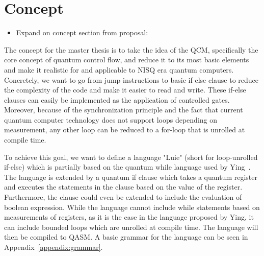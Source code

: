 \chapter{Concept}

\begin{itemize}
    \item Expand on concept section from proposal:
\end{itemize}

The concept for the master thesis is to take the idea of the QCM, specifically the core concept of quantum control flow, and reduce it to its most basic elements and make it realistic for and applicable to NISQ era quantum computers. Concretely, we want to go from jump instructions to basic if-else clause to reduce the complexity of the code and make it easier to read and write. These if-else clauses can easily be implemented as the application of controlled gates. Moreover, because of the synchronization principle and the fact that current quantum computer technology does not support loops depending on measurement, any other loop can be reduced to a for-loop that is unrolled at compile time.

To achieve this goal, we want to define a language "Luie" (short for loop-unrolled if-else) which is partially based on the quantum while language used by Ying~\cite{Ying11}. The language is extended by a quantum if clause which takes a quantum register and executes the statements in the clause based on the value of the register. Furthermore, the clause could even be extended to include the evaluation of boolean expression. While the language cannot include while statements based on measurements of registers, as it is the case in the language proposed by Ying, it can include bounded loops which are unrolled at compile time. The language will then be compiled to QASM. A basic grammar for the language can be seen in Appendix~\ref{appendix:grammar}.
